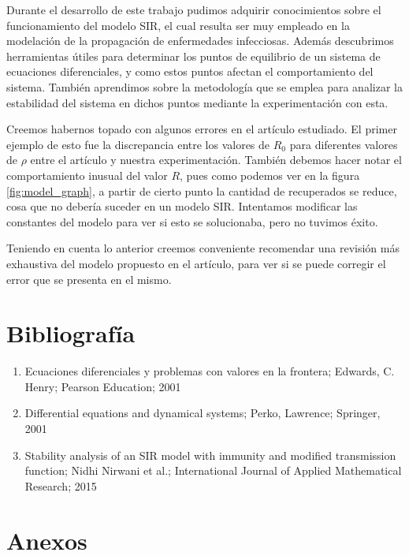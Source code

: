 \documentclass{article}
\begin{document}
Durante el desarrollo de este trabajo pudimos adquirir conocimientos sobre el funcionamiento del modelo SIR, el cual resulta ser muy empleado en la modelaci\'on de la propagación de enfermedades infecciosas. Adem\'as descubrimos herramientas \'utiles para determinar los puntos de equilibrio de un sistema de ecuaciones diferenciales, y como estos puntos afectan el comportamiento del sistema. Tambi\'en aprendimos sobre la  metodolog\'ia que se emplea para analizar la estabilidad del sistema en dichos puntos mediante la experimentaci\'on con esta. \par
Creemos habernos topado con algunos errores en el art\'iculo estudiado. El primer ejemplo de esto fue la discrepancia entre los valores de $R_0$ para diferentes valores de $\rho$ entre el art\'iculo y nuestra experimentaci\'on. Tambi\'en debemos hacer notar el comportamiento inusual del valor $R$, pues como podemos ver en la figura \ref{fig:model_graph}, a partir de cierto punto la cantidad de recuperados se reduce, cosa que no deber\'ia suceder en un modelo SIR. Intentamos modificar las constantes del modelo para ver si esto se solucionaba, pero no tuvimos \'exito. \par
Teniendo en cuenta lo anterior creemos conveniente recomendar una revisi\'on m\'as exhaustiva del modelo propuesto en el art\'iculo, para ver si se puede corregir el error que se presenta en el mismo. \par


\section{Bibliograf\'ia}

\begin{enumerate}
    \item Ecuaciones diferenciales y problemas con valores en la frontera; Edwards, C. Henry; Pearson Education; 2001
    \item Differential equations and dynamical systems; Perko, Lawrence; Springer, 2001
    \item Stability analysis of an SIR model with immunity and modified transmission function; Nidhi Nirwani et al.; International Journal of Applied Mathematical Research; 2015
\end{enumerate}

\section{Anexos}
\end{document}
